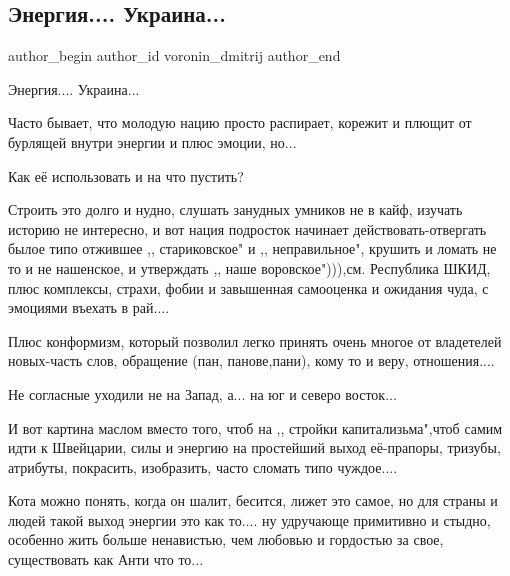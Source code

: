  
 
 
 
 
 
\subsection{Энергия.... Украина...}
\label{sec:25_08_2021.fb.voronin_dmitrij.1.energia_ukraina}
 
\ifcmt
 author_begin
   author_id voronin_dmitrij
 author_end
\fi

Энергия.... Украина...

Часто бывает, что молодую нацию просто распирает, корежит и плющит от бурлящей
внутри энергии и плюс эмоции, но...

Как её использовать и на что пустить?

Строить это долго и нудно, слушать занудных умников не в кайф, изучать историю
не интересно, и вот нация подросток начинает действовать-отвергать былое типо
отжившее ,, стариковское" и ,, неправильное", крушить и ломать не то и не
нашенское, и утверждать ,, наше воровское"))),см. Республика ШКИД, плюс
комплексы, страхи, фобии и завышенная самооценка и ожидания чуда, с эмоциями
въехать в рай....

Плюс конформизм, который позволил легко принять очень многое от владетелей
новых-часть слов, обращение (пан, панове,пани), кому то и веру, отношения....

Не согласные уходили не на Запад, а... на юг и северо восток...

И вот картина маслом вместо того, чтоб на ,, стройки капитализьма",чтоб самим
идти к Швейцарии, силы и энергию на простейший выход её-прапоры, тризубы,
атрибуты, покрасить, изобразить, часто сломать типо чуждое....

Кота можно понять, когда он шалит, бесится, лижет это самое, но для страны и
людей такой выход энергии это как то.... ну удручающе примитивно и стыдно,
особенно жить больше ненавистью, чем любовью и гордостью за свое, существовать
как Анти что то...

